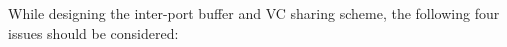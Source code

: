 \documentclass[10pt,conference]{IEEEtran}
\begin{document}
While designing the inter-port buffer and VC sharing scheme, the following four issues should be considered:

\end{document}
